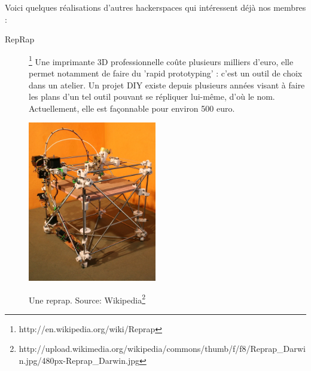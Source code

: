 \documentclass{article}
\begin{document}
Voici quelques réalisations d'autres hackerspaces qui intéressent déjà nos membres :
\begin{description}
\item[RepRap]\footnote{http://en.wikipedia.org/wiki/Reprap} Une imprimante 3D professionnelle coûte plusieurs milliers d'euro, elle permet notamment de faire du 'rapid prototyping' : c'est un outil de choix dans un atelier. Un projet DIY existe depuis plusieurs années visant à faire les plans d'un tel outil pouvant se répliquer lui-même, d'où le nom. Actuellement, elle est façonnable pour environ 500 euro.

\begin{center}
\includegraphics[height=70mm]{reprap-darwin.jpg}

Une reprap. Source: Wikipedia\footnote{http://upload.wikimedia.org/wikipedia/commons/thumb/f/f8/Reprap\_Darwin.jpg/480px-Reprap\_Darwin.jpg}
\end{center}


\end{description}
\end{document}
